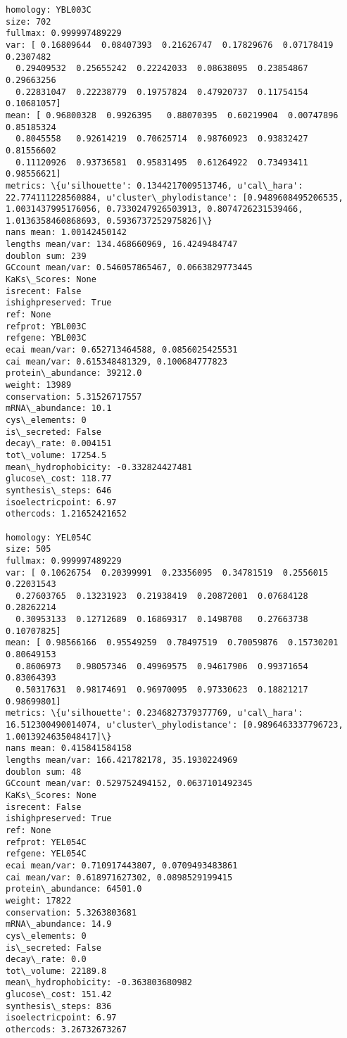 \documentclass[11pt]{article}
\begin{document}
\begin{Verbatim}[commandchars=\\\{\}]
homology: YBL003C
size: 702
fullmax: 0.999997489229
var: [ 0.16809644  0.08407393  0.21626747  0.17829676  0.07178419  0.2307482
  0.29409532  0.25655242  0.22242033  0.08638095  0.23854867  0.29663256
  0.22831047  0.22238779  0.19757824  0.47920737  0.11754154  0.10681057]
mean: [ 0.96800328  0.9926395   0.88070395  0.60219904  0.00747896  0.85185324
  0.8045558   0.92614219  0.70625714  0.98760923  0.93832427  0.81556602
  0.11120926  0.93736581  0.95831495  0.61264922  0.73493411  0.98556621]
metrics: \{u'silhouette': 0.1344217009513746, u'cal\_hara': 22.774111228560884, u'cluster\_phylodistance': [0.9489608495206535, 1.0031437995176056, 0.7330247926503913, 0.8074726231539466, 1.0136358460868693, 0.5936737252975826]\}
nans mean: 1.00142450142
lengths mean/var: 134.468660969, 16.4249484747
doublon sum: 239
GCcount mean/var: 0.546057865467, 0.0663829773445
KaKs\_Scores: None
isrecent: False
ishighpreserved: True
ref: None
refprot: YBL003C
refgene: YBL003C
ecai mean/var: 0.652713464588, 0.0856025425531
cai mean/var: 0.615348481329, 0.100684777823
protein\_abundance: 39212.0
weight: 13989
conservation: 5.31526717557
mRNA\_abundance: 10.1
cys\_elements: 0
is\_secreted: False
decay\_rate: 0.004151
tot\_volume: 17254.5
mean\_hydrophobicity: -0.332824427481
glucose\_cost: 118.77
synthesis\_steps: 646
isoelectricpoint: 6.97
othercods: 1.21652421652

homology: YEL054C
size: 505
fullmax: 0.999997489229
var: [ 0.10626754  0.20399991  0.23356095  0.34781519  0.2556015   0.22031543
  0.27603765  0.13231923  0.21938419  0.20872001  0.07684128  0.28262214
  0.30953133  0.12712689  0.16869317  0.1498708   0.27663738  0.10707825]
mean: [ 0.98566166  0.95549259  0.78497519  0.70059876  0.15730201  0.80649153
  0.8606973   0.98057346  0.49969575  0.94617906  0.99371654  0.83064393
  0.50317631  0.98174691  0.96970095  0.97330623  0.18821217  0.98699801]
metrics: \{u'silhouette': 0.2346827379377769, u'cal\_hara': 16.512300490014074, u'cluster\_phylodistance': [0.9896463337796723, 1.0013924635048417]\}
nans mean: 0.415841584158
lengths mean/var: 166.421782178, 35.1930224969
doublon sum: 48
GCcount mean/var: 0.529752494152, 0.0637101492345
KaKs\_Scores: None
isrecent: False
ishighpreserved: True
ref: None
refprot: YEL054C
refgene: YEL054C
ecai mean/var: 0.710917443807, 0.0709493483861
cai mean/var: 0.618971627302, 0.0898529199415
protein\_abundance: 64501.0
weight: 17822
conservation: 5.3263803681
mRNA\_abundance: 14.9
cys\_elements: 0
is\_secreted: False
decay\_rate: 0.0
tot\_volume: 22189.8
mean\_hydrophobicity: -0.363803680982
glucose\_cost: 151.42
synthesis\_steps: 836
isoelectricpoint: 6.97
othercods: 3.26732673267


\end{Verbatim}
\end{document}
